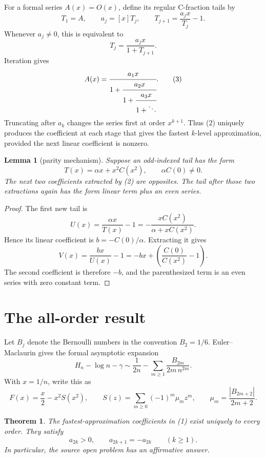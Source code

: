\documentclass[11pt]{article}
\newtheorem{theorem}{Theorem}
\newtheorem{lemma}{Lemma}
\begin{document}
For a formal series \(A(x)=O(x)\), define its regular C-fraction tails by
\[
 T_1=A,
 \qquad a_j=[x]T_j,
 \qquad T_{j+1}=\frac{a_jx}{T_j}-1.                       \tag{2}
\]
Whenever \(a_j\neq0\), this is equivalent to
\[
 T_j=\frac{a_jx}{1+T_{j+1}}.
\]
Iteration gives
\[
 A(x)=\cfrac{a_1x}{1+\cfrac{a_2x}{1+\cfrac{a_3x}{1+\ddots}}}.          \tag{3}
\]
Truncating after \(a_k\) changes the series first at order \(x^{k+1}\).
Thus (2) uniquely produces the coefficient at each stage that gives the
fastest \(k\)-level approximation, provided the next linear coefficient is
nonzero.

\begin{lemma}[parity mechanism]\label{lem:parity}
Suppose an odd-indexed tail has the form
\[
 T(x)=\alpha x+x^2C(x^2),\qquad \alpha C(0)\neq0.
\]
The next two coefficients extracted by (2) are opposites.  The tail after
those two extractions again has the form linear term plus an even series.
\end{lemma}

\begin{proof}
The first new tail is
\[
 U(x)=\frac{\alpha x}{T(x)}-1
     =-\frac{xC(x^2)}{\alpha+xC(x^2)}.
\]
Hence its linear coefficient is \(b=-C(0)/\alpha\).  Extracting it gives
\[
 V(x)=\frac{bx}{U(x)}-1
     =-bx+\left(\frac{C(0)}{C(x^2)}-1\right).              \tag{4}
\]
The second coefficient is therefore \(-b\), and the parenthesized term is an
even series with zero constant term.
\end{proof}

\section{The all-order result}

Let \(B_j\) denote the Bernoulli numbers in the convention \(B_2=1/6\).
Euler--Maclaurin gives the formal asymptotic expansion
\[
 H_n-\log n-\gamma
 \sim \frac{1}{2n}-\sum_{m\geq1}\frac{B_{2m}}{2m\,n^{2m}}.
\]
With \(x=1/n\), write this as
\[
 F(x)=\frac{x}{2}-x^2S(x^2),
 \qquad
 S(z)=\sum_{m\geq0}(-1)^m\mu_m z^m,
 \qquad
 \mu_m=\frac{|B_{2m+2}|}{2m+2}.                           \tag{5}
\]

\begin{theorem}\label{thm:main}
The fastest-approximation coefficients in (1) exist uniquely to every order.
They satisfy
\[
 a_{2k}>0,
 \qquad
 \boxed{a_{2k+1}=-a_{2k}}
 \qquad(k\geq1).
\]
In particular, the source open problem has an affirmative answer.
\end{theorem}
\end{document}
